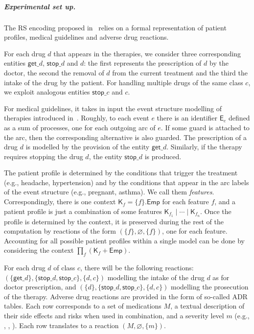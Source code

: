 \subparagraph*{Experimental set up.}
The RS encoding proposed in~\cite{DBLP:conf/cmsb/BowlesBBFGM24} relies on a formal representation of patient profiles, medical guidelines and adverse drug reactions.

For each drug $d$ that appears in the therapies, we consider three corresponding entities $\mathsf{get}\_d$, $\mathsf{stop}\_d$  and $d$: the first represents the prescription of $d$ by the doctor, the second the removal of $d$ from the current treatment and the third the intake of the drug by the patient. For handling multiple drugs of the same class $c$, we exploit analogous entities $\mathsf{stop}\_c$  and $c$.

For medical guidelines, it takes in input the event structure modelling of therapies introduced in~\cite{BC17c}. Roughly, to each event $e$ there is an identifier $\mathsf{E}_e$ defined as a sum of processes, one for each outgoing arc of $e$. If some guard is attached to the arc, then the corresponding alternative is also guarded. The prescription of a drug $d$ is modelled by the provision of the entity $\mathsf{get}\_d$. Similarly, if the therapy requires stopping the drug $d$, the entity $\mathsf{stop}\_d$ is produced.

The patient profile is determined by the conditions that trigger the treatment (e.g., headache, hypertension) and by the conditions that appear in the arc labels of the event structure (e.g., pregnant, asthma). We call them \emph{features}. Correspondingly, there is one context $\mathsf{K}_f = \{f\}.\mathsf{Emp}$ for each feature $f$, and a patient profile is just a combination of some features $\mathsf{K}_{f_1}\mid\cdots\mid \mathsf{K}_{f_n}$. 
Once the profile is determined by the context, it is preserved during the rest of the computation by reactions of the form $(\{f\},\varnothing,\{f\})$, one for each feature.
Accounting for all possible patient profiles within a single model can be done by considering the context $\prod_f (\mathsf{K}_f + \mathsf{Emp})$. 

For each drug $d$ of class $c$, there will be the following reactions: $(\{\mathsf{get}\_d\},\{\mathsf{stop}\_d,\mathsf{stop}\_c\},\{d,c\})$ modelling the intake of the drug $d$ as for doctor prescription, and $(\{d\},\{\mathsf{stop}\_d,\mathsf{stop}\_c\},\{d,c\})$ modelling the prosecution of the therapy.
Adverse drug reactions are provided in the form of so-called ADR tables.
Each row corresponds to a set of medications $M$, a textual description of their side effects and risks when used in combination, and a severity level $m$ (e.g., \minor, \moderate, \major).
Each row translates to a reaction $(M,\varnothing,\{m\})$. 

